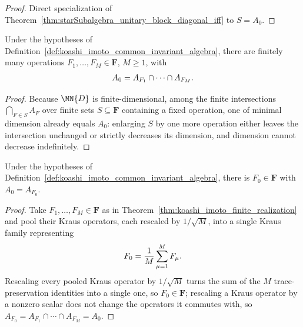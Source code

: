 \begin{proof}
    \leanok
    Direct specialization of
    Theorem~\ref{thm:starSubalgebra_unitary_block_diagonal_iff} to $S=A_0$.
\end{proof}

\begin{theorem}
    \label{thm:koashi_imoto_finite_realization}
    \leanok
    Under the hypotheses of Definition~\ref{def:koashi_imoto_common_invariant_algebra},
    there are finitely many operations $F_1,\ldots,F_M\in\mathbf F$, $M\ge1$, with
    \begin{align}
        A_0=A_{F_1}\cap\cdots\cap A_{F_M}.
        \notag
    \end{align}
\end{theorem}

\begin{proof}
    \leanok
    Because $\MN{D}$ is finite-dimensional, among the finite intersections
    $\bigcap_{F\in S}A_F$ over finite sets $S\subseteq\mathbf F$ containing a
    fixed operation, one of minimal dimension already equals $A_0$: enlarging
    $S$ by one more operation either leaves the intersection unchanged or
    strictly decreases its dimension, and dimension cannot decrease
    indefinitely.
\end{proof}

\begin{theorem}
    \label{thm:koashi_imoto_single_witness}
    \leanok
    Under the hypotheses of Definition~\ref{def:koashi_imoto_common_invariant_algebra},
    there is $F_0\in\mathbf F$ with $A_0=A_{F_0}$.
\end{theorem}

\begin{proof}
    \leanok
    Take $F_1,\ldots,F_M\in\mathbf F$ as in
    Theorem~\ref{thm:koashi_imoto_finite_realization} and pool their Kraus
    operators, each rescaled by $1/\sqrt M$, into a single Kraus family
    representing
    \begin{align}
        F_0=\frac1M\sum_{\mu=1}^M F_\mu.
        \notag
    \end{align}
    Rescaling every pooled Kraus operator by $1/\sqrt M$ turns the sum of the
    $M$ trace-preservation identities into a single one, so $F_0\in\mathbf F$;
    rescaling a Kraus operator by a nonzero scalar does not change the
    operators it commutes with, so $A_{F_0}=A_{F_1}\cap\cdots\cap A_{F_M}=A_0$.
\end{proof}

